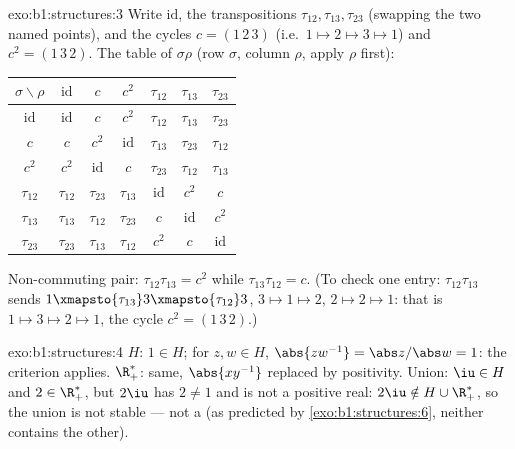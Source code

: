 \begin{solution}{exo:b1:structures:3}
Write $\mathrm{id}$, the transpositions $\tau_{12}, \tau_{13},
\tau_{23}$ (swapping the two named points), and the cycles $c =
(1\,2\,3)$ (i.e.\ $1 \mapsto 2 \mapsto 3 \mapsto 1$) and $c^2 =
(1\,3\,2)$. The table of $\sigma\rho$ (row $\sigma$, column $\rho$,
apply $\rho$ first):
\begin{center}
\renewcommand{\arraystretch}{1.2}
\begin{tabular}{c|cccccc}
$\sigma\backslash\rho$ & $\mathrm{id}$ & $c$ & $c^2$ & $\tau_{12}$ &
$\tau_{13}$ & $\tau_{23}$ \\
\hline
$\mathrm{id}$ & $\mathrm{id}$ & $c$ & $c^2$ & $\tau_{12}$ &
$\tau_{13}$ & $\tau_{23}$ \\
$c$ & $c$ & $c^2$ & $\mathrm{id}$ & $\tau_{13}$ & $\tau_{23}$ &
$\tau_{12}$ \\
$c^2$ & $c^2$ & $\mathrm{id}$ & $c$ & $\tau_{23}$ & $\tau_{12}$ &
$\tau_{13}$ \\
$\tau_{12}$ & $\tau_{12}$ & $\tau_{23}$ & $\tau_{13}$ & $\mathrm{id}$
& $c^2$ & $c$ \\
$\tau_{13}$ & $\tau_{13}$ & $\tau_{12}$ & $\tau_{23}$ & $c$ &
$\mathrm{id}$ & $c^2$ \\
$\tau_{23}$ & $\tau_{23}$ & $\tau_{13}$ & $\tau_{12}$ & $c^2$ & $c$ &
$\mathrm{id}$ \\
\end{tabular}
\end{center}
Non-commuting pair: $\tau_{12}\tau_{13} = c^2$ while
$\tau_{13}\tau_{12} = c$. (To check one entry:
$\tau_{12}\tau_{13}$ sends $1 \xmapsto{\tau_{13}} 3
\xmapsto{\tau_{12}} 3$, $3 \mapsto 1 \mapsto 2$, $2 \mapsto 2 \mapsto
1$: that is $1 \mapsto 3 \mapsto 2 \mapsto 1$, the cycle $c^2 =
(1\,3\,2)$.)
\end{solution}

\begin{solution}{exo:b1:structures:4}
$H$: $1 \in H$; for $z, w \in H$, $\abs{zw^{-1}} = \abs z / \abs w =
1$: the criterion applies. $\R_+^*$: same, $\abs{xy^{-1}}$ replaced by
positivity. Union: $\iu \in H$ and $2 \in \R_+^*$, but $2\iu$ has
 $2 \neq 1$ and is not a positive real: $2\iu \notin H \cup
\R_+^*$, so the union is not stable --- not a  (as predicted
by \cref{exo:b1:structures:6}, neither  contains the other).
\end{solution}

